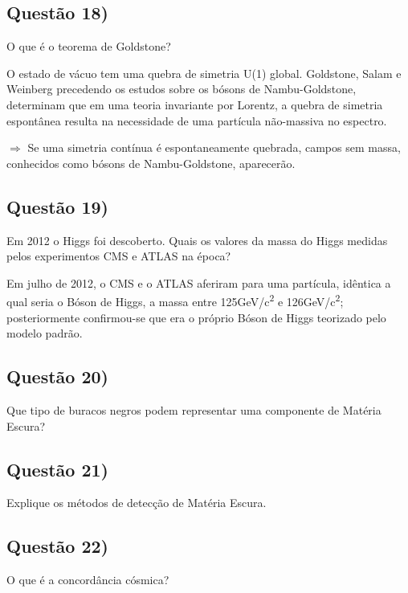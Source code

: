 \documentclass{article}
\begin{document}
  
\subsection*{Questão 18)}
\begin{boxx}
O que é o teorema de Goldstone?
\end{boxx}
 O estado de vácuo tem uma quebra de simetria U(1) global. Goldstone, Salam e Weinberg precedendo os estudos sobre os bósons de Nambu-Goldstone, determinam que em uma teoria invariante por Lorentz, a quebra de simetria espontânea resulta na necessidade de uma partícula não-massiva no espectro.
 
  $\Longrightarrow$ Se uma simetria contínua é espontaneamente quebrada, campos sem massa, conhecidos como bósons de Nambu-Goldstone, aparecerão.
  
\subsection*{Questão 19)}
\begin{boxx}
Em 2012 o Higgs foi descoberto. Quais os valores da massa do Higgs medidas pelos experimentos CMS e ATLAS na época?
\end{boxx}
 Em julho de 2012, o CMS e o ATLAS aferiram para uma partícula, idêntica a qual seria o Bóson de Higgs, a massa entre 125\si{GeV/c^2} e 126\si{GeV/c^2}; posteriormente confirmou-se que era o próprio Bóson de Higgs teorizado pelo modelo padrão. 
 
\subsection*{Questão 20)}
\begin{boxx}
Que tipo de buracos negros podem representar uma componente de Matéria Escura?
\end{boxx}

\subsection*{Questão 21)}
\begin{boxx}
Explique os métodos de detecção de Matéria Escura. 
\end{boxx}

\subsection*{Questão 22)}
\begin{boxx}
O que é a concordância cósmica?
\end{boxx}
\end{document}

